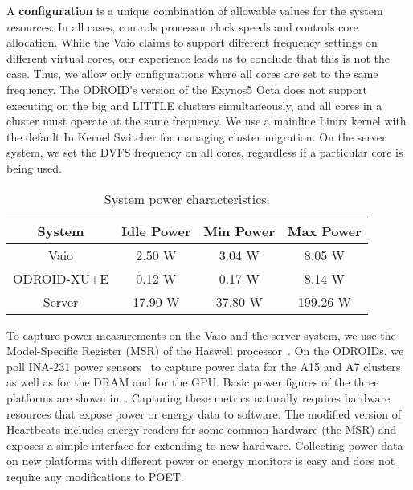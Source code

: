 A \textbf{configuration} is a unique combination of allowable values for the system resources.
In all cases,  controls processor clock speeds and  controls core allocation.
While the Vaio claims to support different frequency settings on different virtual cores, our experience leads us to conclude that this is not the case.
Thus, we allow only configurations where all cores are set to the same frequency.
The ODROID's version of the Exynos5 Octa does not support executing on the big and LITTLE clusters simultaneously, and all cores in a cluster must operate at the same frequency.
We use a mainline Linux kernel with the default In Kernel Switcher for managing cluster migration.
On the server system, we set the DVFS frequency on all cores, regardless if a particular core is being used.

\begin{table}[t]
\centering
\caption{System power characteristics.}
\begin{tabular}{cccc}
  \textbf{System} & \textbf{Idle Power} & \textbf{Min Power} & \textbf{Max Power} \\
  \hline
  \hline
  Vaio        & 2.50 W  & 3.04 W  & 8.05 W \\
  ODROID-XU+E & 0.12 W  & 0.17 W  & 8.14 W \\
  Server      & 17.90 W & 37.80 W & 199.26 W \\
  \hline
  \hline
\end{tabular}
\label{tbl:poet-power}
\end{table}

To capture power measurements on the Vaio and the server system, we use the Model-Specific Register (MSR) of the Haswell processor~\cite{SandyBridge}.
On the ODROIDs, we poll INA-231 power sensors~\cite{ina231} to capture power data for the A15 and A7 clusters as well as for the DRAM and for the GPU.
Basic power figures of the three platforms are shown in~.
Capturing these metrics naturally requires hardware resources that expose power or energy data to software.
The modified version of Heartbeats includes energy readers for some common hardware (\eg the MSR) and exposes a simple interface for extending to new hardware.
Collecting power data on new platforms with different power or energy monitors is easy and does not require any modifications to POET.

